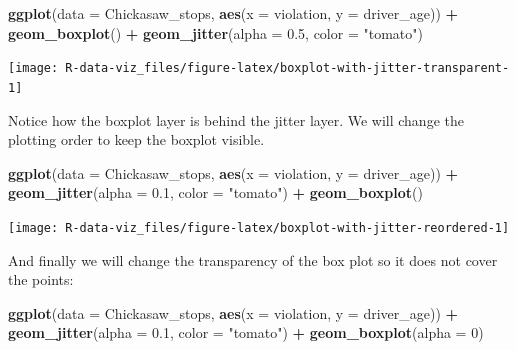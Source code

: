 \documentclass[]{book}
\newenvironment{Shaded}{\begin{snugshade}}{\end{snugshade}}
\newcommand{\KeywordTok}[1]{\textcolor[rgb]{0.13,0.29,0.53}{\textbf{#1}}}
\newcommand{\DataTypeTok}[1]{\textcolor[rgb]{0.13,0.29,0.53}{#1}}
\newcommand{\DecValTok}[1]{\textcolor[rgb]{0.00,0.00,0.81}{#1}}
\newcommand{\FloatTok}[1]{\textcolor[rgb]{0.00,0.00,0.81}{#1}}
\newcommand{\StringTok}[1]{\textcolor[rgb]{0.31,0.60,0.02}{#1}}
\newcommand{\OperatorTok}[1]{\textcolor[rgb]{0.81,0.36,0.00}{\textbf{#1}}}
\newcommand{\NormalTok}[1]{#1}
\theoremstyle{definition}
\theoremstyle{definition}
\theoremstyle{definition}
\theoremstyle{remark}
\begin{document}
\begin{Shaded}
\begin{Highlighting}[]
\KeywordTok{ggplot}\NormalTok{(}\DataTypeTok{data =}\NormalTok{ Chickasaw_stops, }\KeywordTok{aes}\NormalTok{(}\DataTypeTok{x =}\NormalTok{ violation, }\DataTypeTok{y =}\NormalTok{ driver_age)) }\OperatorTok{+}
\StringTok{    }\KeywordTok{geom_boxplot}\NormalTok{() }\OperatorTok{+}
\StringTok{    }\KeywordTok{geom_jitter}\NormalTok{(}\DataTypeTok{alpha =} \FloatTok{0.5}\NormalTok{, }\DataTypeTok{color =} \StringTok{"tomato"}\NormalTok{)}
\end{Highlighting}
\end{Shaded}

\texttt{[image: R-data-viz\_files/figure-latex/boxplot-with-jitter-transparent-1]}

Notice how the boxplot layer is behind the jitter layer. We will change
the plotting order to keep the boxplot visible.

\begin{Shaded}
\begin{Highlighting}[]
\KeywordTok{ggplot}\NormalTok{(}\DataTypeTok{data =}\NormalTok{ Chickasaw_stops, }\KeywordTok{aes}\NormalTok{(}\DataTypeTok{x =}\NormalTok{ violation, }\DataTypeTok{y =}\NormalTok{ driver_age)) }\OperatorTok{+}
\StringTok{    }\KeywordTok{geom_jitter}\NormalTok{(}\DataTypeTok{alpha =} \FloatTok{0.1}\NormalTok{, }\DataTypeTok{color =} \StringTok{"tomato"}\NormalTok{) }\OperatorTok{+}\StringTok{ }
\StringTok{    }\KeywordTok{geom_boxplot}\NormalTok{()}
\end{Highlighting}
\end{Shaded}

\texttt{[image: R-data-viz\_files/figure-latex/boxplot-with-jitter-reordered-1]}

And finally we will change the transparency of the box plot so it does
not cover the points:

\begin{Shaded}
\begin{Highlighting}[]
\KeywordTok{ggplot}\NormalTok{(}\DataTypeTok{data =}\NormalTok{ Chickasaw_stops, }\KeywordTok{aes}\NormalTok{(}\DataTypeTok{x =}\NormalTok{ violation, }\DataTypeTok{y =}\NormalTok{ driver_age)) }\OperatorTok{+}
\StringTok{    }\KeywordTok{geom_jitter}\NormalTok{(}\DataTypeTok{alpha =} \FloatTok{0.1}\NormalTok{, }\DataTypeTok{color =} \StringTok{"tomato"}\NormalTok{) }\OperatorTok{+}
\StringTok{    }\KeywordTok{geom_boxplot}\NormalTok{(}\DataTypeTok{alpha =} \DecValTok{0}\NormalTok{)  }
\end{Highlighting}
\end{Shaded}
\end{document}
